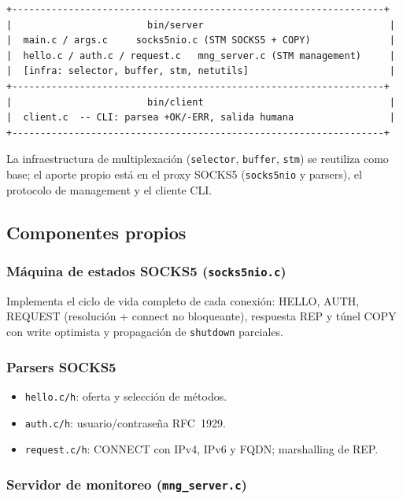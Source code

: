 \documentclass[12pt,a4paper]{article}
\begin{document}
\begin{verbatim}
+------------------------------------------------------------------+
|                        bin/server                                 |
|  main.c / args.c     socks5nio.c (STM SOCKS5 + COPY)              |
|  hello.c / auth.c / request.c   mng_server.c (STM management)     |
|  [infra: selector, buffer, stm, netutils]                         |
+------------------------------------------------------------------+
|                        bin/client                                 |
|  client.c  -- CLI: parsea +OK/-ERR, salida humana                 |
+------------------------------------------------------------------+
\end{verbatim}

La infraestructura de multiplexación (\texttt{selector}, \texttt{buffer},
\texttt{stm}) se reutiliza como base; el aporte propio está en el proxy SOCKS5
(\texttt{socks5nio} y parsers), el protocolo de management y el cliente CLI.

\subsection{Componentes propios}

\subsubsection{Máquina de estados SOCKS5 (\texttt{socks5nio.c})}

Implementa el ciclo de vida completo de cada conexión: HELLO, AUTH, REQUEST
(resolución + connect no bloqueante), respuesta REP y túnel COPY con write
optimista y propagación de \texttt{shutdown} parciales.

\subsubsection{Parsers SOCKS5}

\begin{itemize}
    \item \texttt{hello.c/h}: oferta y selección de métodos.
    \item \texttt{auth.c/h}: usuario/contraseña RFC~1929.
    \item \texttt{request.c/h}: CONNECT con IPv4, IPv6 y FQDN; marshalling de REP.
\end{itemize}

\subsubsection{Servidor de monitoreo (\texttt{mng\_server.c})}
\end{document}
